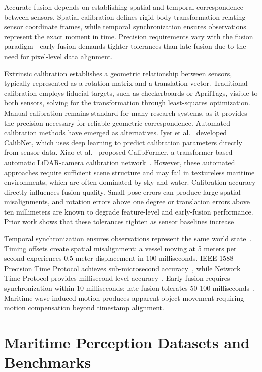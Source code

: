 \documentclass{erauthesis}
\begin{document}
Accurate fusion depends on establishing spatial and temporal correspondence between sensors.
Spatial calibration defines rigid-body transformation relating sensor coordinate frames, while temporal synchronization ensures observations represent the exact moment in time.
Precision requirements vary with the fusion paradigm—early fusion demands tighter tolerances than late fusion due to the need for pixel-level data alignment.

Extrinsic calibration establishes a geometric relationship between sensors, typically represented as a rotation matrix and a translation vector.
Traditional calibration employs fiducial targets, such as checkerboards or AprilTags, visible to both sensors, solving for the transformation through least-squares optimization.
Manual calibration remains standard for many research systems, as it provides the precision necessary for reliable geometric correspondence.
Automated calibration methods have emerged as alternatives. Iyer et al.~\cite{iyer2018} developed CalibNet, which uses deep learning to predict calibration parameters directly from sensor data.
Xiao et al.~\cite{xiao2024} proposed CalibFormer, a transformer-based automatic LiDAR-camera calibration network~\cite{schneider2017, wu2021}.
However, these automated approaches require sufficient scene structure and may fail in textureless maritime environments, which are often dominated by sky and water.
Calibration accuracy directly influences fusion quality. Small pose errors can produce large spatial misalignments, and rotation errors above one degree or translation errors above ten millimeters are known to degrade feature-level and early-fusion performance. Prior work shows that these tolerances tighten as sensor baselines increase ~\cite{geiger2012,huang2024,park2014extrinsic,bijelic2020robust}

Temporal synchronization ensures observations represent the same world state~\cite{westenberger2011}.
Timing offsets create spatial misalignment: a vessel moving at 5 meters per second experiences 0.5-meter displacement in 100 milliseconds.
IEEE 1588 Precision Time Protocol achieves sub-microsecond accuracy~\cite{ptp2008}, while Network Time Protocol provides millisecond-level accuracy~\cite{furgale2013, liu2021}.
Early fusion requires synchronization within 10 milliseconds; late fusion tolerates 50-100 milliseconds~\cite{huang2024}.
Maritime wave-induced motion produces apparent object movement requiring motion compensation beyond timestamp alignment.

\section{Maritime Perception Datasets and Benchmarks}
\end{document}

